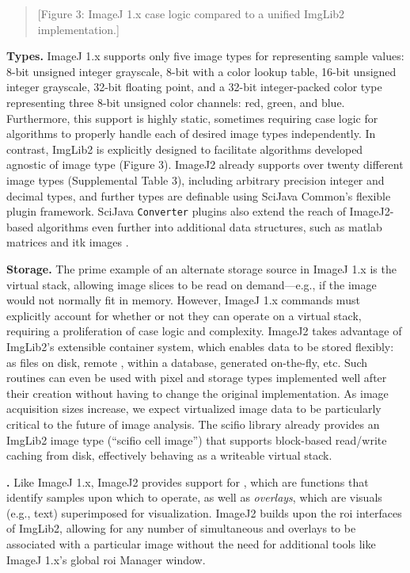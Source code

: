 \documentclass{bmcart}
\begin{document}
\begin{quote}
[Figure 3: ImageJ 1.x case logic compared to a unified ImgLib2 implementation.]
\end{quote}

\textbf{Types.} ImageJ 1.x supports only five image types for representing
sample values: 8-bit unsigned integer grayscale, 8-bit with a color lookup
table, 16-bit unsigned integer grayscale, 32-bit floating point, and a 32-bit
integer-packed color type representing three 8-bit unsigned color channels:
red, green, and blue. Furthermore, this support is highly static, sometimes
requiring case logic for algorithms to properly handle each of desired image
types independently. In contrast, ImgLib2 is explicitly designed to facilitate
algorithms developed agnostic of image type (Figure 3). ImageJ2 already
supports over twenty different image types (Supplemental Table 3), including
arbitrary precision integer and decimal types, and further types are definable
using SciJava Common's flexible plugin framework. SciJava \texttt{Converter}
plugins also extend the reach of ImageJ2-based algorithms even further into
additional data structures, such as \acrshort{matlab} matrices
\cite{imagej_matlab} and \acrshort{itk} images \cite{imagej_itk}.

\textbf{Storage.} The prime example of an alternate storage source in ImageJ
1.x is the virtual stack, allowing image slices to be read on demand---e.g., if
the image would not normally fit in memory. However, ImageJ 1.x commands must
explicitly account for whether or not they can operate on a virtual stack,
requiring a proliferation of case logic and complexity. ImageJ2 takes advantage
of ImgLib2's extensible container system, which enables data to be stored
flexibly: as files on disk, remote , within a database,
generated on-the-fly, etc. Such routines can even be used with pixel and
storage types implemented well after their creation without having to change
the original implementation. As image acquisition sizes increase, we expect
virtualized image data to be particularly critical to the future of image
analysis. The \acrshort{scifio} library already provides an ImgLib2 image type
(``\acrshort{scifio} cell image'') that supports block-based read/write caching
from disk, effectively behaving as a writeable virtual stack.

\textbf{.} Like ImageJ 1.x, ImageJ2 provides support for
\textit{}, which are functions that identify samples upon which
to operate, as well as \textit{overlays}, which are visuals (e.g., text)
superimposed for visualization. ImageJ2 builds upon the \acrshort{roi}
interfaces of ImgLib2, allowing for any number of simultaneous 
and overlays to be associated with a particular image without the need for
additional tools like ImageJ 1.x's global \acrshort{roi} Manager window.
\end{document}
